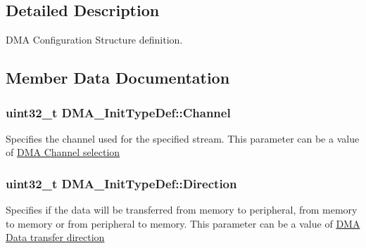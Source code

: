 \subsection{Detailed Description}
D\+MA Configuration Structure definition. 

\subsection{Member Data Documentation}
\subsubsection[{\texorpdfstring{Channel}{Channel}}]{\setlength{\rightskip}{0pt plus 5cm}uint32\+\_\+t D\+M\+A\+\_\+\+Init\+Type\+Def\+::\+Channel}\hypertarget{struct_d_m_a___init_type_def_af62608eb25864208cae5d59acef282a6}{}\label{struct_d_m_a___init_type_def_af62608eb25864208cae5d59acef282a6}
Specifies the channel used for the specified stream. This parameter can be a value of \hyperlink{group___d_m_a___channel__selection}{D\+MA Channel selection} 
\subsubsection[{\texorpdfstring{Direction}{Direction}}]{\setlength{\rightskip}{0pt plus 5cm}uint32\+\_\+t D\+M\+A\+\_\+\+Init\+Type\+Def\+::\+Direction}\hypertarget{struct_d_m_a___init_type_def_a0145b5d0e074fa8e2e185ecf2c4a15ca}{}\label{struct_d_m_a___init_type_def_a0145b5d0e074fa8e2e185ecf2c4a15ca}
Specifies if the data will be transferred from memory to peripheral, from memory to memory or from peripheral to memory. This parameter can be a value of \hyperlink{group___d_m_a___data__transfer__direction}{D\+MA Data transfer direction} 
